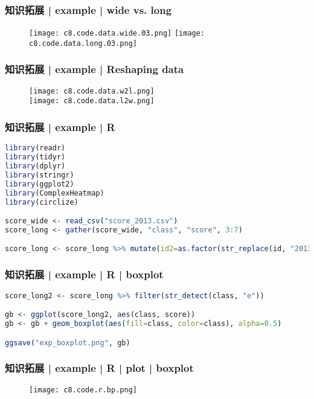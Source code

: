 \begin{frame}
  \frametitle{知识拓展 | example | wide vs. long}
  \begin{figure}
    \centering
    \texttt{[image: c8.code.data.wide.03.png]}\qquad
    \texttt{[image: c8.code.data.long.03.png]}
  \end{figure}
\end{frame}

\begin{frame}
  \frametitle{知识拓展 | example | Reshaping data}
  \begin{figure}
    \centering
    \texttt{[image: c8.code.data.w2l.png]}\\
    \vspace{0.5em}
    \texttt{[image: c8.code.data.l2w.png]}
  \end{figure}
\end{frame}

\begin{frame}[fragile]
  \frametitle{知识拓展 | example | R}
\begin{lstlisting}[language=r]
library(readr)
library(tidyr)
library(dplyr)
library(stringr)
library(ggplot2)
library(ComplexHeatmap)
library(circlize)

score_wide <- read_csv("score_2013.csv")
score_long <- gather(score_wide, "class", "score", 3:7)

score_long <- score_long %>% mutate(id2=as.factor(str_replace(id, "20130521", "")))
\end{lstlisting}
\end{frame}

\begin{frame}[fragile]
  \frametitle{知识拓展 | example | R | boxplot}
\begin{lstlisting}[language=r]
score_long2 <- score_long %>% filter(str_detect(class, "e"))

gb <- ggplot(score_long2, aes(class, score))
gb <- gb + geom_boxplot(aes(fill=class, color=class), alpha=0.5)

ggsave("exp_boxplot.png", gb)
\end{lstlisting}
\end{frame}

\begin{frame}
  \frametitle{知识拓展 | example | R | plot | boxplot}
  \begin{figure}
    \centering
    \texttt{[image: c8.code.r.bp.png]}
  \end{figure}
\end{frame}

